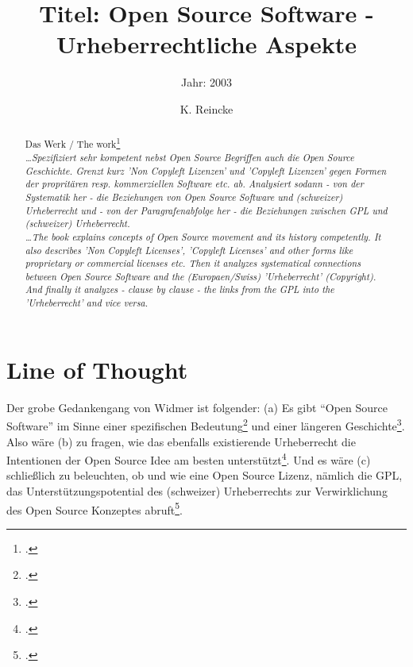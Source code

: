 \documentclass[DIV=calc,BCOR=5mm,11pt,headings=small,oneside,abstract=true, toc=bib]{scrartcl}
\begin{document}

\titlehead{Literaturexzerpt}
\subject{Autor(en): Mike J. Widmer}
\title{Titel: Open Source Software - Urheberrechtliche Aspekte}
\subtitle{Jahr: 2003 }
\author{K. Reincke}

\maketitle

\begin{abstract}
\noindent
Das Werk / The work\footcite[][]{Widmer2003a} \\
\noindent \itshape
\ldots Spezifiziert sehr kompetent nebst Open Source Begriffen auch die Open
Source Geschichte. Grenzt kurz 'Non Copyleft Lizenzen' und 'Copyleft Lizenzen'
gegen Formen der propritären resp. kommerziellen Software etc. ab. Analysiert
sodann - von der Systematik her - die Beziehungen von Open Source Software und
(schweizer) Urheberrecht und - von der Paragrafenabfolge her - die Beziehungen
zwischen GPL und (schweizer) Urheberrecht.\\
\noindent
\ldots The book explains concepts of Open Source movement and its history
competently. It also describes 'Non Copyleft Licenses', 'Copyleft Licenses' and
other forms like proprietary or commercial licenses etc. Then it analyzes
systematical connections between Open Source Software and the (Europaen/Swiss)
'Urheberrecht' (Copyright). And finally it analyzes - clause by clause - the
links from the GPL into the 'Urheberrecht' and vice versa.
\end{abstract}

\footnotesize
\tableofcontents
\normalsize

\section{Line of Thought}

Der grobe Gedankengang von Widmer ist folgender: (a) Es gibt \enquote{Open
Source Software} im Sinne einer spezifischen
Bedeutung\footcite[vgl.][21ff]{Widmer2003a} und einer längeren
Geschichte\footcite[vgl.][8ff]{Widmer2003a}. Also wäre (b) zu fragen, wie das
ebenfalls existierende Urheberrecht die Intentionen der Open Source Idee am
besten unterstützt\footcite[vgl.][47ff]{Widmer2003a}. Und es wäre (c)
schließlich zu beleuchten, ob und wie eine Open Source Lizenz, nämlich die GPL,
das Unterstützungspotential des (schweizer) Urheberrechts zur Verwirklichung des
Open Source Konzeptes abruft\footcite[vgl.][102ff]{Widmer2003a}.
\end{document}
